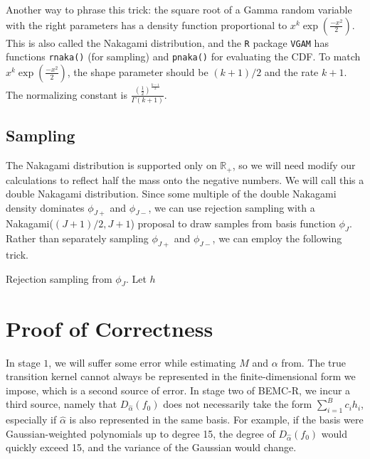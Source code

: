 \documentclass{article}
\begin{document}
Another way to phrase this trick: the square root of a Gamma random variable with the right parameters has a density function proportional to $x^k\exp(\frac{-x^2}{2})$. This is also called the Nakagami distribution, and the \texttt{R} package \texttt{VGAM} has functions \texttt{rnaka()} (for sampling) and \texttt{pnaka()} for evaluating the CDF. To match $x^k\exp(\frac{-x^2}{2})$, the shape parameter should be $(k+1)/2$ and the rate $k+1$. The normalizing constant is $\frac{(\frac{1}{2})^{\frac{k-1}{2}}}{ \Gamma(k+1)}$. 

\subsection{Sampling}
The Nakagami distribution is supported only on $\mathbb{R}_+$, so we will need modify our calculations to reflect half the mass onto the negative numbers. We will call this a double Nakagami distribution. Since some multiple of the double Nakagami density dominates $\phi_{J+}$ and $\phi_{J-}$, we can use rejection sampling with a Nakagami($(J+1)/2, J+1$) proposal to draw samples from basis function $\phi_J$. Rather than separately sampling $\phi_{J+}$ and $\phi_{J-}$, we can employ the following trick.

\begin{algorithm}[h]
\caption{Rejection sampling from $\phi_{J}$. Let $h$}

\Indp
\Indm
\end{algorithm}


 

\section{Proof of Correctness}
In stage $1$, we will suffer some error while estimating $M$ and $\alpha$ from. The true transition kernel cannot always be represented in the finite-dimensional form we impose, which is a second source of error. In stage two of BEMC-R, we incur a third source, namely that $D_{\hat{\alpha}}(f_0)$ does not necessarily take the form $\sum_{i=1}^B c_i h_i$, especially if $\hat{\alpha}$ is also represented in the same basis. For example, if the basis were Gaussian-weighted polynomials up to degree 15, the degree of $D_{\hat{\alpha}}(f_0)$ would quickly exceed 15, and the variance of the Gaussian would change. 



\end{document}
